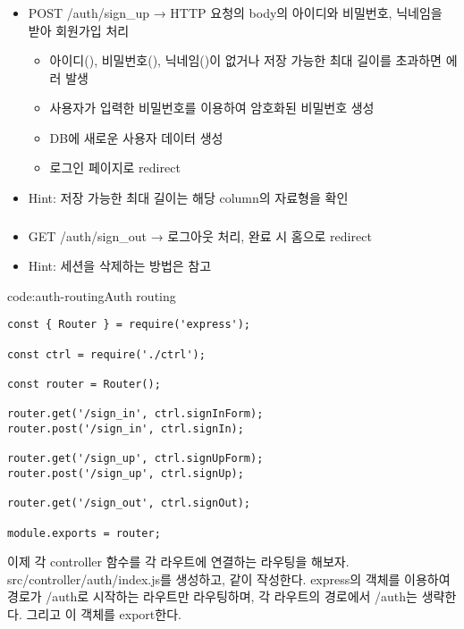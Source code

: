 \subsubsection*{}
\begin{itemize}
    \item POST /auth/sign\_up → HTTP 요청의 body의 아이디와 비밀번호, 닉네임을 받아 회원가입 처리
    \begin{itemize}
        \item 아이디(), 비밀번호(), 닉네임()이 없거나 저장 가능한 최대 길이를 초과하면  에러 발생
        \item 사용자가 입력한 비밀번호를 이용하여 암호화된 비밀번호 생성
        \item DB에 새로운 사용자 데이터 생성
        \item 로그인 페이지로 redirect
    \end{itemize}
    \item Hint: 저장 가능한 최대 길이는 해당 column의 자료형을 확인
\end{itemize}

\subsubsection*{}
\begin{itemize}
    \item GET /auth/sign\_out → 로그아웃 처리, 완료 시 홈으로 redirect
    \item Hint: 세션을 삭제하는 방법은  참고
\end{itemize}

\begin{code}{code:auth-routing}{Auth routing}
\begin{verbatim}
const { Router } = require('express');

const ctrl = require('./ctrl');

const router = Router();

router.get('/sign_in', ctrl.signInForm);
router.post('/sign_in', ctrl.signIn);

router.get('/sign_up', ctrl.signUpForm);
router.post('/sign_up', ctrl.signUp);

router.get('/sign_out', ctrl.signOut);

module.exports = router;
\end{verbatim}
\end{code}

이제 각 controller 함수를 각 라우트에 연결하는 라우팅을 해보자. src/controller/auth/index.js를 생성하고, \과 같이 작성한다. \은 express의  객체를 이용하여 경로가 /auth로 시작하는 라우트만 라우팅하며, 각 라우트의 경로에서 /auth는 생략한다. 그리고 이  객체를 export한다.

